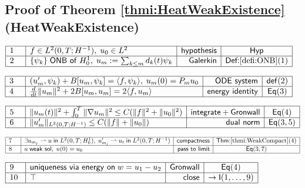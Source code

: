 \documentclass[11pt,reqno]{amsart}
\begin{document}
	\subsection*{Proof of Theorem \protect\ref{thmi:HeatWeakExistence} (\textsf{HeatWeakExistence})}
	\noindent$\begin{array}{|m{0.5cm}|l|r|c|}
	\hline
	1 & f\in L^{2}(0,T;H^{-1}),\;u_{0}\in L^{2} & \mathsf{hypothesis} & \mathsf{Hyp} \\ \hline
	2 & \{\psi_{k}\}\;\mathsf{ONB\ of}\;H_{0}^{1},\;u_{m}:=\sum_{k\le m}d_{k}(t)\psi_{k} & \mathsf{Galerkin} & \textsf{Def:}\ref{defi:ONB}(1) \\ \hline
	\end{array}$
	\par\nointerlineskip\noindent$\begin{array}{|m{0.5cm}|l|r|c|}
	\hline
	3 & (u_{m}^{\prime},\psi_{k})+B[u_{m},\psi_{k}]=\langle f,\psi_{k}\rangle,\;u_{m}(0)=P_{m}u_{0} & \mathsf{ODE\ system} & \mathsf{def}(2) \\ \hline
	4 & \tfrac{d}{dt}\|u_{m}\|^{2}+2B[u_{m},u_{m}]=2\langle f,u_{m}\rangle & \mathsf{energy\ identity} & \mathsf{Eq}(3) \\ \hline
	\end{array}$
	\par\nointerlineskip\noindent$\begin{array}{|m{0.5cm}|l|r|c|}
	\hline
	5 & \|u_{m}(t)\|^{2}+\int_{0}^{T}\|\nabla u_{m}\|^{2}\le C(\|f\|^{2}+\|u_{0}\|^{2}) & \mathsf{integrate+Gronwall} & \mathsf{Eq}(4) \\ \hline
	6 & \|u_{m}^{\prime}\|_{L^{2}(0,T;H^{-1})}\le C(\|f\|+\|u_{0}\|) & \mathsf{dual\ norm} & \mathsf{Eq}(3,5) \\ \hline
	\end{array}$
	\par\nointerlineskip\noindent$\begin{array}{|m{0.5cm}|l|r|c|}
	\hline
	7 & \exists u_{m_{j}}\rightharpoonup u\;\mathsf{in}\;L^{2}(0,T;H_{0}^{1}),\;u_{m_{j}}^{\prime}\rightharpoonup u_{t}\;\mathsf{in}\;L^{2}(0,T;H^{-1}) & \mathsf{compactness} & \textsf{Thm:}\ref{thmi:WeakCompact}(4) \\ \hline
	8 & u\;\mathsf{weak\ sol},\;u(0)=u_{0} & \mathsf{pass\ to\ limit} & \mathsf{Eq}(3,7) \\ \hline
	\end{array}$
	\par\nointerlineskip\noindent$\begin{array}{|m{0.5cm}|l|r|c|}
	\hline
	9 & \mathsf{uniqueness\ via\ energy\ on}\;w=u_{1}-u_{2} & \mathsf{Gronwall} & \mathsf{Eq}(4) \\ \hline
	10 & \top & \mathsf{close} & \to\mathsf{I}(1,\dots,9) \\ \hline
	\end{array}$
	\medskip
	
\end{document}
